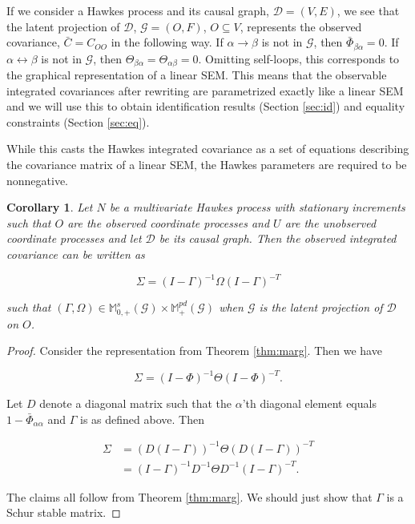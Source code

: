 \documentclass[accepted]{uai2021} %
\newtheorem{cor}[thm]{Corollary}
\begin{document}
If we consider a Hawkes process and its causal graph, $\mathcal{D} = (V,E)$, we 
see that the latent projection of $\mathcal{D}$, $\mathcal{G} = (O,F)$, 
$O\subseteq V$, represents the observed covariance, $\bar{C} = C_{OO}$ in the 
following way. If $\alpha\rightarrow\beta$ is not in $\mathcal{G}$, then 
$\bar{\Phi}_{\beta\alpha}=0$. If $\alpha\leftrightarrow\beta$ is not in 
$\mathcal{G}$, then $\Theta_{\beta\alpha} = \Theta_{\alpha\beta} = 0$. Omitting 
self-loops, this corresponds to the graphical representation of a linear SEM. 
This means that the observable integrated covariances after rewriting are 
parametrized exactly like a linear SEM and we will use this to obtain 
identification results (Section \ref{sec:id}) and equality constraints (Section 
\ref{sec:eq}).

While 
this 
casts the Hawkes integrated covariance as a set of equations describing the 
covariance 
matrix of a linear SEM, the Hawkes parameters are required to be nonnegative. 

\begin{cor}
	Let $N$ be a multivariate Hawkes process with stationary increments such 
	that $O$ are the 
	observed 
	coordinate processes and $U$ are the unobserved coordinate processes and 
	let $\mathcal{D}$ be its causal graph. Then the observed integrated 
	covariance can be written as
	
	$$
	\Sigma = (I - \Gamma)^{-1}\Omega (I - \Gamma)^{-T}
	$$
	
	\noindent such that $(\Gamma, \Omega) \in \mathbb{M}_{0,+}^s(\mathcal{G}) 
	\times 
	\mathbb{M}_+^{pd}(\mathcal{G})$ when $\mathcal{G}$ is the latent projection 
	of $\mathcal{D}$ on $O$.
	
	\label{cor:normEq}
\end{cor}

\begin{proof}
	Consider the representation from Theorem \ref{thm:marg}. Then we have 
	
	$$
	\Sigma= (I - \Phi)^{-1} \Theta (I - \Phi)^{-T}.
	$$ 
	
	Let $D$ denote a 
	diagonal matrix such that the $\alpha$'th diagonal element equals 
	$1 - \bar{\Phi}_{\alpha\alpha}$ and $\Gamma$ is as defined above. Then
	
	
	\begin{align}
	\Sigma 
	& = (D(I - \Gamma))^{-1}\Theta (D(I - \Gamma))^{-T} \nonumber \\
	& = (I - \Gamma)^{-1}D^{-1}\Theta D^{-1}(I - 
	\Gamma)^{-T}.
	\label{eq:Gtilde}
	\end{align}
	
	The claims all follow from Theorem \ref{thm:marg}. We should just show that 
	$\Gamma$ is a Schur stable matrix.
\end{proof}
\end{document}
